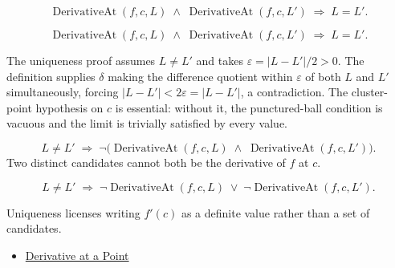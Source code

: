 \begin{remark*}
\[
\operatorname{DerivativeAt}(f,c,L) \;\land\; \operatorname{DerivativeAt}(f,c,L')
\;\Rightarrow\; L = L'.
\]
\end{remark*}

\begin{remark*}
\[
\operatorname{DerivativeAt}(f,c,L)
\;\land\;
\operatorname{DerivativeAt}(f,c,L')
\;\Longrightarrow\; L = L'.
\]
\end{remark*}

\begin{remark*}
The uniqueness proof assumes $L \neq L'$ and takes $\varepsilon = |L - L'|/2 > 0$. The definition supplies $\delta$ making the difference quotient within $\varepsilon$ of both $L$ and $L'$ simultaneously, forcing $|L - L'| < 2\varepsilon = |L - L'|$, a contradiction. The cluster-point hypothesis on $c$ is essential: without it, the punctured-ball condition is vacuous and the limit is trivially satisfied by every value.
\end{remark*}

\begin{remark*}
\[
L \neq L' \;\Rightarrow\; \neg\bigl(\operatorname{DerivativeAt}(f,c,L) \;\land\; \operatorname{DerivativeAt}(f,c,L')\bigr).
\]
Two distinct candidates cannot both be the derivative of $f$ at $c$.
\end{remark*}

\begin{remark*}
\[
L \neq L'
\;\Longrightarrow\;
\neg\operatorname{DerivativeAt}(f,c,L)
\;\lor\;
\neg\operatorname{DerivativeAt}(f,c,L').
\]
\end{remark*}

\begin{remark*}[Interpretation]
Uniqueness licenses writing $f'(c)$ as a definite value rather than a set of candidates.
\end{remark*}

\begin{dependencies}
\begin{itemize}
  \item \hyperref[def:derivative-at-a-point]{Derivative at a Point}
\end{itemize}
\end{dependencies}



